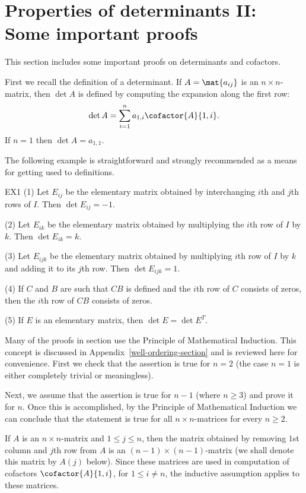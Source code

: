 \section{Properties of determinants II: Some important proofs}
\label{sec:determinant-proofs}

This section includes some important proofs on determinants and
cofactors.

First we recall the definition of a determinant. If $A=\mat{a_{ij} }$
is an $n\times n$-matrix, then $\det A$ is defined by computing the
expansion along the first row:
\begin{equation}
  \label{E1}
  \det A=\sum_{i=1}^n a_{1,i} \cofactor{A}{1,i}.
\end{equation}
If $n=1$ then $\det A=a_{1,1}$.

The following example is straightforward and strongly recommended as a
means for getting used to definitions.

\begin{example}{}{EX1}
  (1) Let $E_{ij}$ be the elementary matrix obtained by interchanging
  $i$th and $j$th rows of $I$.  Then $\det E_{ij}=-1$.

  (2) Let $E_{ik}$ be the elementary matrix obtained by multiplying
  the $i$th row of $I$ by $k$.  Then $\det E_{ik}=k$.

  (3) Let $E_{ijk}$ be the elementary matrix obtained by multiplying
  $i$th row of $I$ by $k$ and adding it to its $j$th row. Then
  $\det E_{ijk}=1$.

  (4) If $C$ and $B$ are such that $CB$ is defined and the $i$th row
  of $C$ consists of zeros, then the $i$th row of $CB$ consists of
  zeros.

  (5) If $E$ is an elementary matrix, then $\det E=\det E^T$.
\end{example}

Many of the proofs in section use the Principle of Mathematical
Induction. This concept is discussed in
Appendix~\ref{well-ordering-section} and is reviewed here for
convenience.  First we check that the assertion is true for $n=2$ (the
case $n=1$ is either completely trivial or meaningless).

Next, we assume that the assertion is true for $n-1$ (where $n\geq 3$)
and prove it for $n$.  Once this is accomplished, by the Principle of
Mathematical Induction we can conclude that the statement is true for
all $n\times n$-matrices for every $n\geq 2$.

If $A$ is an $n\times n$-matrix and $1\leq j \leq n$, then the matrix
obtained by removing $1$st column and $j$th row from $A$ is an
$(n-1)\times (n-1)$-matrix (we shall denote this matrix by $A(j)$
below). Since these matrices are used in computation of cofactors
$\cofactor{A}{1,i}$, for $1\leq i\neq n$, the inductive assumption applies
to these matrices.

